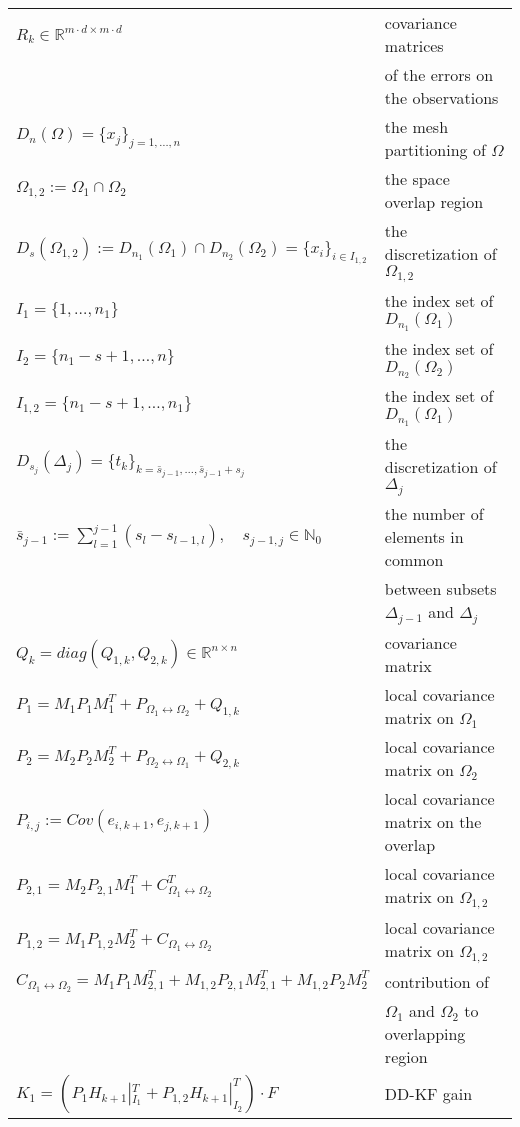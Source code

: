 \documentclass[smallcondensed]{svjour3}
\begin{document}
\begin{table}[]
\begin{tabular}{|l|l|}
    $R_{k}\in \mathbb{R}^{m\cdot d \times m\cdot d}$& covariance matrices \\& of the errors  on the observations\\
    $D_{n}(\Omega)=\{{x}_{j}\}_{j=1,\ldots,n}$ & the mesh partitioning of $\Omega$\\
   $ \Omega_{1,2}:=\Omega_{1}\cap \Omega_{2}$ &  the space overlap region\\
  $ D_{s}(\Omega_{1,2}):=D_{n_{1}}(\Omega_{1})\cap D_{n_{2}}(\Omega_{2})=\{x_{i}\}_{i\in I_{1,2}}$& 
 the discretization of $\Omega_{1,2}$\\
$I_{1}=\{1,\ldots,n_{1}\}$ & the index set of $D_{n_{1}}(\Omega_{1})$\\
$I_{2}=\{n_{1}-s+1,\ldots,n\}$ & the index set of $D_{n_{2}}(\Omega_{2})$\\
$ I_{1,2}=\{n_{1}-s+1,\ldots,n_{1}\}$ & the index set of $D_{n_{1}}(\Omega_{1})$\\
$D_{s_{j}}(\Delta_{j})=\{t_{k}\}_{k=\bar{s}_{j-1},\ldots,\bar{s}_{j-1}+s_{j}}$& the discretization of $\Delta_j$\\
$ \bar{s}_{j-1}:=\sum_{l=1}^{j-1}(s_{l}-s_{l-1,l}), \quad  s_{j-1,j}\in \mathbb{N}_{0}$ &
the number of elements in common\\ &  between  subsets $\Delta_{j-1}$ and $\Delta_{j}$\\
$Q_{k}=diag(Q_{1,k},Q_{2,k})\in \mathbb{R}^{n\times n}$ &  covariance matrix\\ 
$P_{1}=M_{1}P_{1}M_{1}^{T}+P_{\Omega_{1}\leftrightarrow \Omega_{2}}+Q_{1,k}$ & local covariance matrix on $\Omega_1$\\
$P_{2}=M_{2}P_{2}M_{2}^{T}+P_{\Omega_{2}\leftrightarrow \Omega_{1}} +Q_{2,k}$&local covariance matrix on $\Omega_2$\\
$P_{i,j}:=Cov(e_{i,k+1},e_{j,k+1})$ & local covariance matrix on the overlap \\
$P_{2,1}=M_{2}P_{2,1}M_{1}^{T}+C_{\Omega_{1}\leftrightarrow \Omega_{2}}^{T}$&local covariance matrix on $\Omega_{1,2}$\\
$P_{1,2}=M_{1}P_{1,2}M_{2}^{T}+C_{\Omega_{1}\leftrightarrow \Omega_{2}}$ &local covariance matrix on $\Omega_{1,2}$\\
$C_{\Omega_{1}\leftrightarrow \Omega_{2}} =M_{1}P_{1}M_{2,1}^{T}+M_{1,2}P_{2,1}M_{2,1}^{T}+M_{1,2}P_{2}M_{2}^{T}$ &  contribution of \\&$\Omega_{1}$ and $\Omega_{2}$ to  overlapping region\\ 
$K_{1}=(P_{1}H_{k+1}|_{I_{1}}^{T}+P_{1,2}H_{k+1}|_{I_{2}}^{T})\cdot F$ & DD-KF gain\\

\end{tabular}
\end{table}
\end{document}
